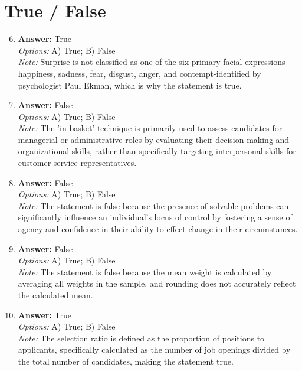 \documentclass[12pt]{article}
\begin{document}
\section*{True / False}
\begin{enumerate}[label=\arabic*.]
\setcounter{enumi}{5}
\item \textbf{Answer:} True
\\ \textit{Options:} A) True; B) False
\\ \textit{Note:} Surprise is not classified as one of the six primary facial expressions-happiness, sadness, fear, disgust, anger, and contempt-identified by psychologist Paul Ekman, which is why the statement is true.
\item \textbf{Answer:} False
\\ \textit{Options:} A) True; B) False
\\ \textit{Note:} The 'in-basket' technique is primarily used to assess candidates for managerial or administrative roles by evaluating their decision-making and organizational skills, rather than specifically targeting interpersonal skills for customer service representatives.
\item \textbf{Answer:} False
\\ \textit{Options:} A) True; B) False
\\ \textit{Note:} The statement is false because the presence of solvable problems can significantly influence an individual's locus of control by fostering a sense of agency and confidence in their ability to effect change in their circumstances.
\item \textbf{Answer:} False
\\ \textit{Options:} A) True; B) False
\\ \textit{Note:} The statement is false because the mean weight is calculated by averaging all weights in the sample, and rounding does not accurately reflect the calculated mean.
\item \textbf{Answer:} True
\\ \textit{Options:} A) True; B) False
\\ \textit{Note:} The selection ratio is defined as the proportion of positions to applicants, specifically calculated as the number of job openings divided by the total number of candidates, making the statement true.
\end{enumerate}
\end{document}
